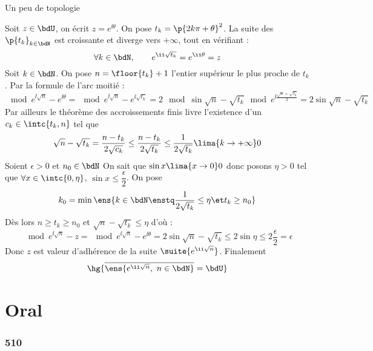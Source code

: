 \documentclass[a4paper,french,bookmarks]{book}
\begin{document}
    \begin{form}{Un peu de topologie}{}
        \begin{center}
        \end{center}
        \medskip
        
        Soit $z \in \bdU$, on écrit $z = e^{\ii \theta}$. On pose $t_k = \p{2k\pi + \theta}^2$. La suite des $\p{t_k}_{k \in \bdN}$ est croissante et diverge vers $+\infty$, tout en vérifiant :
        \[ \forall k \in \bdN,\qquad e^{\ii\sqrt{t_k}} = e^{\ii \theta} = z \]
        Soit $k \in \bdN$. On pose $n = \floor{t_k} + 1$ l'entier supérieur le plus proche de $t_k$. Par la formule de l'arc moitié :
        \[ \mod{e^{\ii\sqrt{n}} - e^{\ii \theta}} = \mod{e^{\ii\sqrt{n}} - e^{\ii \sqrt{t_k}}} = 2\mod{\sin{\sqrt{n} - \sqrt{t_k}}}\mod{e^{\ii\frac{\sqrt{n} + \sqrt{t_k}}{2}}} = 2\sin{\sqrt{n} - \sqrt{t_k}}\]
        Par ailleurs le théorème des accroissements finis livre l'existence d'un $c_k \in \intc{t_k, n}$ tel que
        \[ \sqrt{n} - \sqrt{t_k} = \dfrac{n - t_k}{2\sqrt{c_k}} \leq \dfrac{n - t_k}{2\sqrt{t_k}} \leq \dfrac{1}{2\sqrt{t_k}} \lima{k \to +\infty} 0 \]
        Soient $\epsilon > 0$ et $n_0 \in \bdN$ On sait que $\sin{x} \lima{x \to 0} 0$ donc posons $\eta > 0$ tel que $\forall x \in \intc{0, \eta}$, $\sin{x} \leq \dfrac{\epsilon}{2}$. On pose 
        \[ k_0 = \min\ens{k \in \bdN \enstq \dfrac{1}{2\sqrt{t_k}} \leq \eta \et t_k \geq n_0}\]
        Dès lors $n \geq t_k \geq n_0$ et $\sqrt{n} - \sqrt{t_k} \leq \eta$ d'où :
        \[ \mod{e^{\ii\sqrt{n}} - z} = \mod{e^{\ii\sqrt{n}} - e^{\ii \theta}} = 2\sin{\sqrt{n} - \sqrt{t_k}} \leq 2\sin{\eta} \leq 2\dfrac{\epsilon}{2} = \epsilon \]
        Donc $z$ est valeur d'adhérence de la suite $\suite{e^{\ii \sqrt{n}}}$. Finalement 
        \[ \hg{\overline{\ens{e^{\ii \sqrt{n}},\ n \in \bdN}} = \bdU}\]
    \end{form}
    
     \chapter{Oral}

     \subsection{510}
\end{document}
